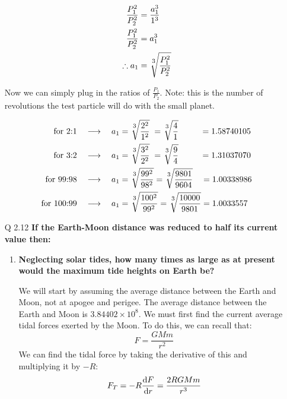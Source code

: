 \documentclass[10pt]{article}
\begin{document}
\begin{enumerate}
		\begin{align*}
			\frac{P_1^2}{P_2^2} &= \frac{a_1^3}{1^3} \\
			\frac{P_1^2}{P_2^2} &= a_1^3 \\
			\therefore a_1 &= \sqrt[\uproot{3}\scriptstyle 3]{\frac{P_1^2}{P_2^2}}
		\end{align*}
		
		Now we can simply plug in the ratios of $\displaystyle \frac{P_1}{P_2}$. Note: this is the number of revolutions the test particle will do with the small planet.
		
		\begin{align*}
			\text{for 2:1} \quad \longrightarrow \quad a_1 &= \sqrt[\uproot{3}\scriptstyle 3]{\frac{2^2}{1^2}} \; = \sqrt[\uproot{3}\scriptstyle 3]{\frac{4}{1}} \hspace{26px} = 1.58740105 \\ 
			\text{for 3:2} \quad \longrightarrow \quad a_1 &= \sqrt[\uproot{3}\scriptstyle 3]{\frac{3^2}{2^2}} \; = \sqrt[\uproot{3}\scriptstyle 3]{\frac{9}{4}} \hspace{26px} = 1.31037070 \\ 
			\text{for 99:98} \quad \longrightarrow \quad a_1 &= \sqrt[\uproot{3}\scriptstyle 3]{\frac{99^2}{98^2}} = \sqrt[\uproot{3}\scriptstyle 3]{\frac{9801}{9604}} \hspace{10px} = 1.00338986 \\ 
			\text{for 100:99} \quad \longrightarrow \quad a_1 &= \sqrt[\uproot{3}\scriptstyle 3]{\frac{100^2}{99^2}} = \sqrt[\uproot{3}\scriptstyle 3]{\frac{10000}{9801}} = 1.0033557\\ 
		\end{align*}
		
		
		
		\newpage
		\item [Q 2.12] \textbf{If the Earth-Moon distance was reduced to half its current value then: }
		\begin{enumerate}
			\item \textbf{Neglecting solar tides, how many times as large as at present would the maximum tide heights on Earth be?}
			
			We will start by assuming the average distance between the Earth and Moon, not at apogee and perigee. The average distance between the Earth and Moon is $3.84402\times 10^8$. We must first find the current average tidal forces exerted by the Moon. To do this, we can recall that:
			\[ F = \frac{GMm}{r^2} \]
			We can find the tidal force by taking the derivative of this and multiplying it by $-R$:
			\[ F_T = -R \dv{F}{r} = \frac{2RGMm}{r^3} \]
			

\end{enumerate}
\end{enumerate}
\end{document}
